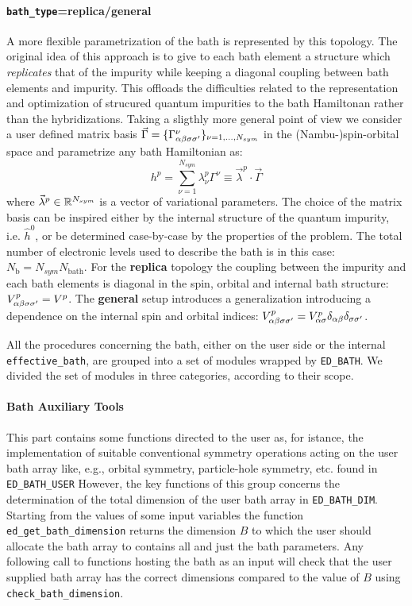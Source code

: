 \documentclass[edipack2.tex]{subfiles}
\begin{document}
\paragraph{{\tt bath\_type}={\bf replica}/{\bf general}} A more flexible
parametrization of the bath is represented by this topology. The
original idea of this approach is to give to each bath element a structure which {\it replicates}
that of the impurity while keeping a diagonal coupling between bath
elements and impurity. This offloads the difficulties related to the
representation and optimization of strucured quantum impurities to the
bath Hamiltonan rather than the hybridizations.
Taking a sligthly more general point of view we consider a user
defined matrix basis $\vec{\Gamma}=\{ \Gamma^\nu_{\alpha\beta\sigma\sigma'} \}_{\nu=1,\dots,N_{sym}}$ in the (Nambu-)spin-orbital
space and parametrize any bath Hamiltonian as:
$$
h^p = \sum_{\nu=1}^{N_{sym}} \lambda^p_\nu
\Gamma^\nu\equiv \vec{\lambda}^p\cdot \vec{\Gamma}
$$
where $\vec{\lambda}^p\in\mathbb{R}^{N_{sym}}$ is a vector of variational parameters. 
The choice of the matrix basis can be inspired either by the internal structure
of the quantum impurity, i.e. $\hat{h}^0$, or be determined
case-by-case by the properties of the problem.
The total number of electronic levels used to describe the bath is in
this case: $N_\mathrm{b} = N_{sym} N_\mathrm{bath}$. 
For the {\bf replica}  topology the coupling between the impurity and
each bath elements is diagonal in the spin, orbital and internal bath
structure: $V^p_{\alpha\beta\sigma\sigma'} = V^p$. The
{\bf general} setup introduces a generalization introducing a
dependence on the internal spin and orbital indices: $V^p_{\alpha\beta\sigma\sigma'}
= V^p_{\alpha\sigma}\delta_{\alpha\beta}\delta_{\sigma\sigma'}$. 


All the procedures concerning the bath, either on the user side or the
internal {\tt effective\_bath}, are grouped into a set of modules
wrapped by {\tt ED\_BATH}.
We divided the set of modules in three categories, according to their
scope.
\paragraph{Bath Auxiliary Tools}
This part contains some functions directed to the user as, for
istance, the implementation of suitable conventional symmetry
operations acting on the user bath array like, e.g., orbital symmetry,
particle-hole symmetry, etc. found in {\tt ED\_BATH\_USER}
However, the key functions of this group concerns the determination
of the total dimension of the user bath array in {\tt ED\_BATH\_DIM}.
Starting from the values
of some input variables the function {\tt ed\_get\_bath\_dimension}
returns the dimension $B$ to which the  user should allocate the bath
array to contains all and just the bath parameters. Any following call
to functions hosting the bath as an input will check that the user supplied
bath array has the correct dimensions compared to the value of $B$
using {\tt check\_bath\_dimension}. 
\end{document}
